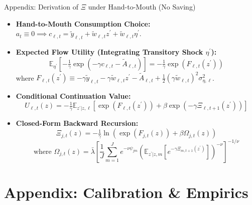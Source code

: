 \documentclass[aspectratio=169, 10pt]{beamer}
\begin{document}
\begin{frame}{Appendix: Derivation of $\Xi$ under Hand-to-Mouth (No Saving) \hfill \hyperlink{main:margins}{\scriptsize{}}}\label{backup:htm_derivation}
    \begin{itemize}\small\setlength{\itemsep}{2.5pt}
        \item \textbf{Hand-to-Mouth Consumption Choice:} $a_t \equiv 0 \implies c_{\ell,t} = \tilde{y}_{\ell,t} + \tilde{w}_{\ell,t}z^\prime + \tilde{w}_{\ell,t}\eta^\prime$.
        \item \textbf{Expected Flow Utility (Integrating Transitory Shock $\eta^\prime$):}
        $$\mathbb{E}_{\eta^\prime} \left[ -\tfrac{1}{\gamma} \exp\left(-\gamma c_{\ell,t} - \tilde{A}_{\ell,t}\right) \right] = -\tfrac{1}{\gamma} \exp\left( F_{\ell,t}(z^\prime) \right)$$
        where $F_{\ell,t}(z^\prime) \equiv -\gamma \tilde{y}_{\ell,t} - \gamma \tilde{w}_{\ell,t} z^\prime - \tilde{A}_{\ell,t} + \tfrac{1}{2}(\gamma \tilde{w}_{\ell,t})^2 \sigma_{\eta,\ell}^2$.
        \item \textbf{Conditional Continuation Value:}
        $$U_{\ell,t}(z) = -\tfrac{1}{\gamma} \mathbb{E}_{z^\prime | z, \ell} \left[ \exp\left(F_{\ell,t}(z^\prime)\right) + \beta \exp\left(-\gamma \Xi_{\ell,t+1}(z^\prime)\right) \right]$$
        \item \textbf{Closed-Form Backward Recursion:}
        $$\Xi_{j,t}(z) = -\tfrac{1}{\gamma} \ln \left( \exp\left(F_{j,t}(z)\right) + \beta \Omega_{j,t}(z) \right)$$
        $$\text{where } \Omega_{j,t}(z) = \bar{\lambda} \left[ \frac{1}{J} \sum_{m=1}^J e^{-\nu \psi_{j m}} \left( \mathbb{E}_{z^\prime|z, m} \left[ e^{-\gamma \Xi_{m,t+1}(z^\prime)} \right] \right)^{-\nu} \right]^{-1/\nu}$$
    \end{itemize}
\end{frame}
\section{Appendix: Calibration \& Empirics}
\end{document}
